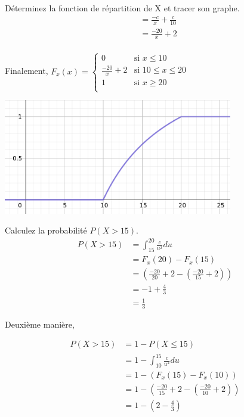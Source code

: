 \begin{exo}
\begin{subexo}{Déterminez la fonction de répartition de X et tracer son graphe.}
\begin{align*}
			&= \frac{-c}{x} + \frac{c}{10} \\
			&= \frac{-20}{x} + 2 \\
		\end{align*}
		\begin{center}
			Finalement,   	$ F_x(x) =\begin{cases}
				0 & \text{si $x \le 10$} \\
				\frac{-20}{x} + 2 & \text{si $10 \leq x \leq 20$} \\
				1 & \text{si $x \geq 20$} \\
			\end{cases}$
		\end{center}
		\begin{center}
			\includegraphics[width=10cm]{ex3_b.png}
		\end{center}
	\end{subexo}
	\begin{subexo}{Calculez la probabilité $P(X > 15)$.}
		\begin{align*}
			P(X > 15) &= \displaystyle\int_{15}^{20}{\frac{c}{u^2}}du \\
			&= F_x(20) - F_x(15) \\
			&= \left( \frac{-20}{20} + 2 - \left(\frac{-20}{15} + 2\right)\right) \\
			&= -1 + \frac{4}{3} \\ 
			&= \frac{1}{3}
		\end{align*}
		\begin{flushleft}
			Deuxième manière,
		\end{flushleft}
		\begin{align*}
			P(X > 15) &= 1 - P(X \leq 15) \\
			&= 1 - \displaystyle\int_{10}^{15}{\frac{c}{u^2}}du \\
			&= 1 - (F_x(15) - F_x(10)) \\
			&= 1 - \left( \frac{-20}{15} + 2 - \left(\frac{-20}{10} + 2\right)\right) \\
			&= 1 - \left(2 -\frac{4}{3}\right) \\

\end{align*}
\end{subexo}
\end{exo}
